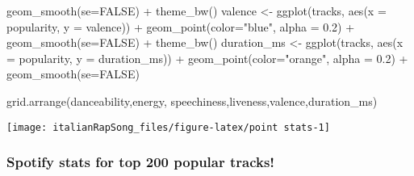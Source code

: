 \documentclass[
]{article}
\newenvironment{Shaded}{\begin{snugshade}}{\end{snugshade}}
\newcommand{\AttributeTok}[1]{\textcolor[rgb]{0.77,0.63,0.00}{#1}}
\newcommand{\ConstantTok}[1]{\textcolor[rgb]{0.00,0.00,0.00}{#1}}
\newcommand{\FloatTok}[1]{\textcolor[rgb]{0.00,0.00,0.81}{#1}}
\newcommand{\FunctionTok}[1]{\textcolor[rgb]{0.00,0.00,0.00}{#1}}
\newcommand{\NormalTok}[1]{#1}
\newcommand{\OtherTok}[1]{\textcolor[rgb]{0.56,0.35,0.01}{#1}}
\newcommand{\SpecialCharTok}[1]{\textcolor[rgb]{0.00,0.00,0.00}{#1}}
\newcommand{\StringTok}[1]{\textcolor[rgb]{0.31,0.60,0.02}{#1}}
\begin{document}
\begin{Shaded}
\begin{Highlighting}[]
  \FunctionTok{geom\_smooth}\NormalTok{(}\AttributeTok{se=}\ConstantTok{FALSE}\NormalTok{) }\SpecialCharTok{+}
  \FunctionTok{theme\_bw}\NormalTok{()}
\NormalTok{valence }\OtherTok{\textless{}{-}} \FunctionTok{ggplot}\NormalTok{(tracks, }\FunctionTok{aes}\NormalTok{(}\AttributeTok{x =}\NormalTok{ popularity, }\AttributeTok{y =}\NormalTok{ valence)) }\SpecialCharTok{+}
  \FunctionTok{geom\_point}\NormalTok{(}\AttributeTok{color=}\StringTok{"blue"}\NormalTok{, }\AttributeTok{alpha =} \FloatTok{0.2}\NormalTok{) }\SpecialCharTok{+}
  \FunctionTok{geom\_smooth}\NormalTok{(}\AttributeTok{se=}\ConstantTok{FALSE}\NormalTok{) }\SpecialCharTok{+}
  \FunctionTok{theme\_bw}\NormalTok{()}
\NormalTok{duration\_ms }\OtherTok{\textless{}{-}} \FunctionTok{ggplot}\NormalTok{(tracks, }\FunctionTok{aes}\NormalTok{(}\AttributeTok{x =}\NormalTok{ popularity, }\AttributeTok{y =}\NormalTok{ duration\_ms)) }\SpecialCharTok{+}
  \FunctionTok{geom\_point}\NormalTok{(}\AttributeTok{color=}\StringTok{"orange"}\NormalTok{, }\AttributeTok{alpha =} \FloatTok{0.2}\NormalTok{) }\SpecialCharTok{+}
  \FunctionTok{geom\_smooth}\NormalTok{(}\AttributeTok{se=}\ConstantTok{FALSE}\NormalTok{)}

\FunctionTok{grid.arrange}\NormalTok{(danceability,energy, speechiness,liveness,valence,duration\_ms)}
\end{Highlighting}
\end{Shaded}

\begin{center}\texttt{[image: italianRapSong\_files/figure-latex/point stats-1]} \end{center}

\hypertarget{spotify-stats-for-top-200-popular-tracks}{%
\subsubsection{Spotify stats for top 200 popular
tracks!}\label{spotify-stats-for-top-200-popular-tracks}}
\end{document}
